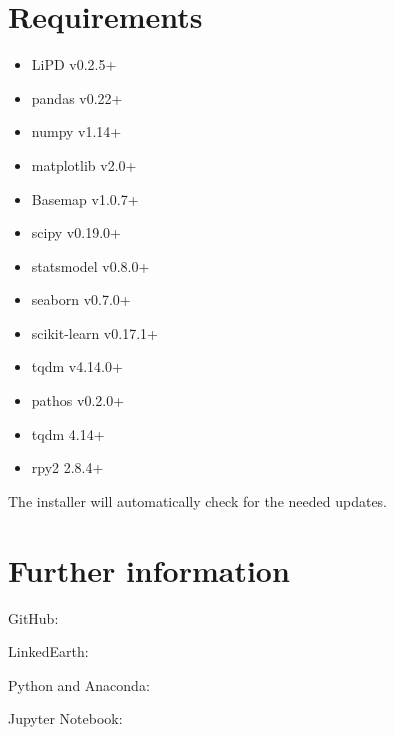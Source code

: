 \documentclass[letterpaper,10pt,english]{sphinxmanual}
\begin{document}
\section{Requirements}
\label{\detokenize{Introduction:requirements}}\begin{itemize}
\item {} 
LiPD v0.2.5+

\item {} 
pandas v0.22+

\item {} 
numpy v1.14+

\item {} 
matplotlib v2.0+

\item {} 
Basemap v1.0.7+

\item {} 
scipy v0.19.0+

\item {} 
statsmodel v0.8.0+

\item {} 
seaborn v0.7.0+

\item {} 
scikit-learn v0.17.1+

\item {} 
tqdm v4.14.0+

\item {} 
pathos v0.2.0+

\item {} 
tqdm 4.14+

\item {} 
rpy2 2.8.4+

\end{itemize}

The installer will automatically check for the needed updates.


\section{Further information}
\label{\detokenize{Introduction:further-information}}
\begin{DUlineblock}{0em}
\item[] GitHub: 
\item[] LinkedEarth: 
\item[] Python and Anaconda: 
\item[] Jupyter Notebook: 
\end{DUlineblock}
\end{document}
